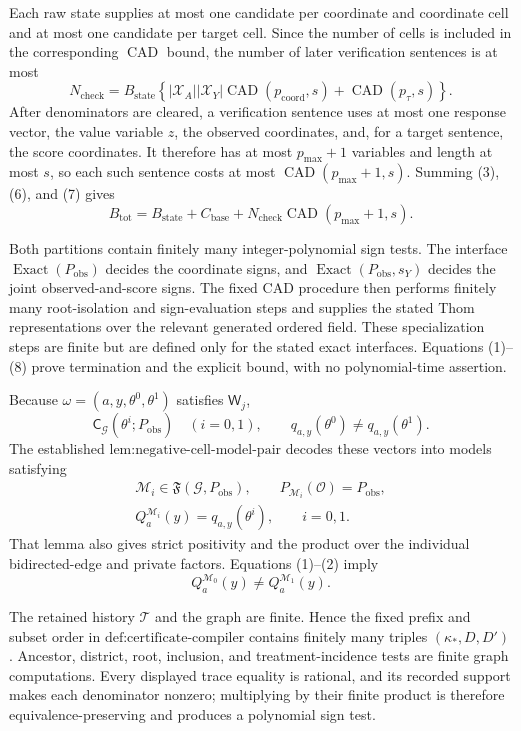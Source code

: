 Each raw state supplies at most one candidate per coordinate and coordinate cell and at most one candidate per target cell. Since the number of cells is included in the corresponding \(\operatorname{CAD}\) bound, the number of later verification sentences is at most
\[
N_{\mathrm{check}}
=B_{\mathrm{state}}
\left\{|\mathcal X_A||\mathcal X_Y|
\operatorname{CAD}(p_{\mathrm{coord}},s)
+\operatorname{CAD}(p_{\tau},s)\right\}.
\tag{7}
\]
After denominators are cleared, a verification sentence uses at most one response vector, the value variable \(z\), the observed coordinates, and, for a target sentence, the score coordinates. It therefore has at most \(p_{\max}+1\) variables and length at most \(s\), so each such sentence costs at most \(\operatorname{CAD}(p_{\max}+1,s)\). Summing (3), (6), and (7) gives
\[
B_{\mathrm{tot}}
=B_{\mathrm{state}}+C_{\mathrm{base}}
+N_{\mathrm{check}}\operatorname{CAD}(p_{\max}+1,s).
\tag{8}
\]

Both partitions contain finitely many integer-polynomial sign tests. The interface \(\operatorname{Exact}(P_{\mathrm{obs}})\) decides the coordinate signs, and \(\operatorname{Exact}(P_{\mathrm{obs}},s_Y)\) decides the joint observed-and-score signs. The fixed CAD procedure then performs finitely many root-isolation and sign-evaluation steps and supplies the stated Thom representations over the relevant generated ordered field. These specialization steps are finite but are defined only for the stated exact interfaces. Equations (1)--(8) prove termination and the explicit bound, with no polynomial-time assertion.

Because \(\omega=(a,y,\theta^0,\theta^1)\) satisfies \(\mathsf W_j\),
\[
\mathsf C_{\mathcal G}(\theta^i;P_{\mathrm{obs}})\quad(i=0,1),
\qquad
q_{a,y}(\theta^0)\ne q_{a,y}(\theta^1).
\tag{1}
\]
The established \(\text{lem:negative-cell-model-pair}\) decodes these vectors into models satisfying
\[
\begin{gathered}
\mathcal M_i\in\mathfrak F(\mathcal G,P_{\mathrm{obs}}),
\qquad
P_{\mathcal M_i}(\mathcal O)=P_{\mathrm{obs}},\\
Q_a^{\mathcal M_i}(y)=q_{a,y}(\theta^i),
\qquad i=0,1.
\end{gathered}
\tag{2}
\]
That lemma also gives strict positivity and the product over the individual bidirected-edge and private factors. Equations (1)--(2) imply
\[
Q_a^{\mathcal M_0}(y)\ne Q_a^{\mathcal M_1}(y).
\tag{3}
\]

The retained history \(\mathcal T\) and the graph are finite. Hence the fixed prefix and subset order in \(\text{def:certificate-compiler}\) contains finitely many triples \((\kappa_*,D,D')\). Ancestor, district, root, inclusion, and treatment-incidence tests are finite graph computations. Every displayed trace equality is rational, and its recorded support makes each denominator nonzero; multiplying by their finite product is therefore equivalence-preserving and produces a polynomial sign test.

